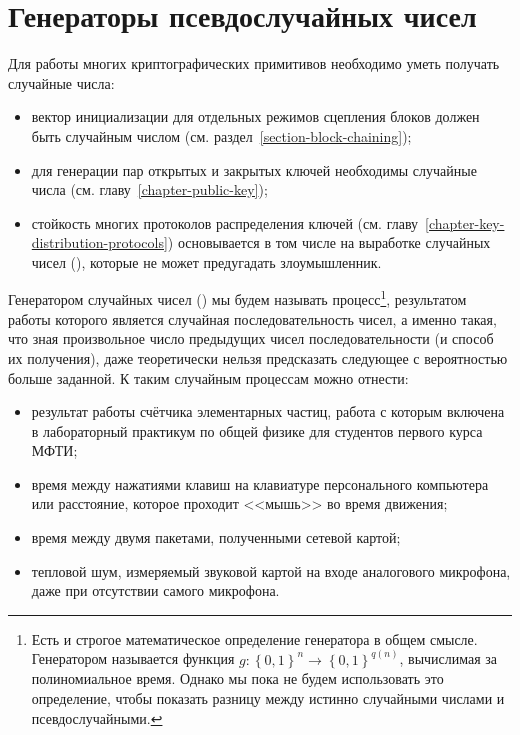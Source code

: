 \chapter{Генераторы псевдослучайных чисел}\label{chapter-generators}

Для работы многих криптографических примитивов необходимо уметь получать случайные числа:
\begin{itemize}
	\item вектор инициализации для отдельных режимов сцепления блоков должен быть случайным числом (см. раздел~\ref{section-block-chaining});
	\item для генерации пар открытых и закрытых ключей необходимы случайные числа (см. главу~\ref{chapter-public-key});
	\item стойкость многих протоколов распределения ключей (см. главу~\ref{chapter-key-distribution-protocols}) основывается в том числе на выработке случайных чисел (), которые не может предугадать злоумышленник.
\end{itemize}

Генератором случайных чисел () мы будем называть процесс\footnote{Есть и строгое математическое определение генератора в общем смысле. Генератором называется функция $g: \left\{0, 1\right\}^{n} \to \left\{0, 1\right\}^{q\left(n\right)}$, вычислимая за полиномиальное время. Однако мы пока не будем использовать это определение, чтобы показать разницу между истинно случайными числами и псевдослучайными.}, результатом работы которого является случайная последовательность чисел, а именно такая, что зная произвольное число предыдущих чисел последовательности (и способ их получения), даже теоретически нельзя предсказать следующее с вероятностью больше заданной. К таким случайным процессам можно отнести:

\begin{itemize}
	\item результат работы счётчика элементарных частиц, работа с которым включена в лабораторный практикум по общей физике для студентов первого курса МФТИ;
	\item время между нажатиями клавиш на клавиатуре персонального компьютера или расстояние, которое проходит <<мышь>> во время движения;
	\item время между двумя пакетами, полученными сетевой картой;
	\item тепловой шум, измеряемый звуковой картой на входе аналогового микрофона, даже при отсутствии самого микрофона.
\end{itemize}

